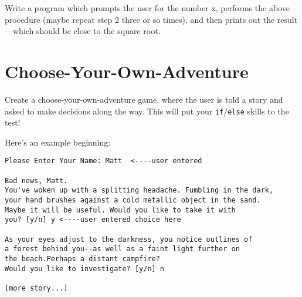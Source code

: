\documentclass{hitec}
\begin{document}
\noindent Write a program which prompts the user for the number x, performs the above procedure (maybe repeat step 2 three or so times), and then prints out the result---which should be close to the square root.

\section{Choose-Your-Own-Adventure}
Create a choose-your-own-adventure game, where the user is told a story and asked to make decisions along the way. This will put your \texttt{if}/\texttt{else} skills to the test! 

\noindent Here's an example beginning:

\begin{verbatim}	
Please Enter Your Name: Matt  <----user entered

Bad news, Matt.
You've woken up with a splitting headache. Fumbling in the dark, 
your hand brushes against a cold metallic object in the sand. 
Maybe it will be useful. Would you like to take it with 
you? [y/n] y <----user entered choice here

As your eyes adjust to the darkness, you notice outlines of 
a forest behind you--as well as a faint light further on 
the beach.Perhaps a distant campfire? 
Would you like to investigate? [y/n] n

[more story...]
\end{verbatim}
\end{document}
